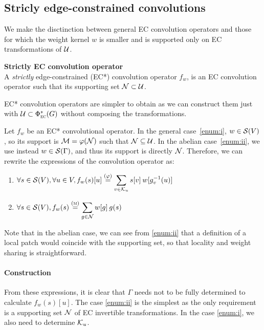 \subsection{Stricly edge-constrained convolutions}
\label{sec:ec}

We make the disctinction between general EC convolution operators and those for which the weight kernel $w$ is smaller and is supported only on EC transformations of $\cu$.

\begin{definition}\textbf{Strictly EC convolution operator}\\
A \emph{strictly} edge-constrained (EC*) convolution operator $f_w$, is an EC convolution operator such that its supporting set $\cn \subset \cu$.
\end{definition}

\begin{remark}EC* convolution operators are simpler to obtain as we can construct them just with $\cu \subset \Phi^*_{\EC}(G)$ without composing the transformations.
\end{remark}

Let $f_w$ be an EC* convolutional operator. In the general case~\ref{enum:i}, $w \in \cs(V)$, so its support is $\cm = \varphi(\cn)$ such that $\cn \subseteq \cu$. In the abelian case~\ref{enum:ii}, we use instead $w \in \cs(\Gamma)$, and thus its support is directly $\cn$.
Therefore, we can rewrite the expressions of the convolution operator as:
\begin{enumerate}[label=(\roman*)]
  \item $\forall s \in \cs(V), \forall u \in V, f_w(s)[u]
          \overset{(\varphi)}= \displaystyle\sum_{v \in \ck_u} s[v] \h{2} w[g_v^{-1}(u)]$ \label{enum:i}
  \item $\forall s \in \cs(V), f_w(s) \overset{(\M)}= \displaystyle\sum_{g \in \cn} w[g] \h{2} g(s)$ \label{enum:ii}
\end{enumerate}

\begin{remark}
Note that in the abelian case, we can see from \ref{enum:ii} that a definition of a local patch would coincide with the supporting set, so that locality and weight sharing is straightforward.
\end{remark}

\paragraph{Construction}
From these expressions, it is clear that $\Gamma$ needs not to be fully determined to calculate $f_w(s)[u]$. The case \ref{enum:ii} is the simplest as the only requirement is a supporting set $\cn$ of EC invertible transformations. In the case \ref{enum:i}, we also need to determine $\ck_u$.

